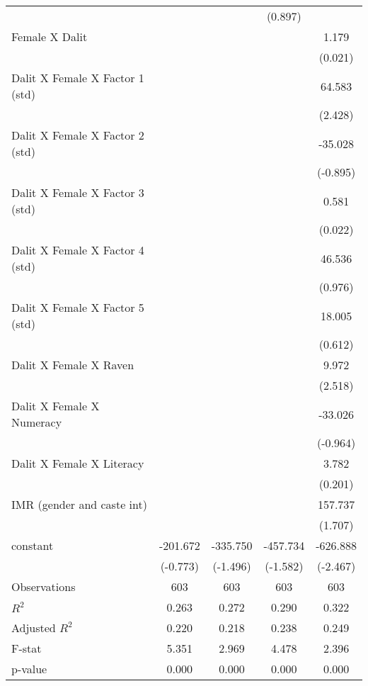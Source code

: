 \begin{table}[htbp]
{\begin{tabular}{lcccc}
          &       &       & (0.897) &  \\
    Female X Dalit &       &       &       & 1.179 \\
          &       &       &       & (0.021) \\
    Dalit X Female X Factor 1 (std) &       &       &       & 64.583 \\
          &       &       &       & (2.428) \\
    Dalit X Female X Factor 2 (std) &       &       &       & -35.028 \\
          &       &       &       & (-0.895) \\
    Dalit X Female X Factor 3 (std) &       &       &       & 0.581 \\
          &       &       &       & (0.022) \\
    Dalit X Female X Factor 4 (std) &       &       &       & 46.536 \\
          &       &       &       & (0.976) \\
    Dalit X Female X Factor 5 (std) &       &       &       & 18.005 \\
          &       &       &       & (0.612) \\
    Dalit X Female X Raven &       &       &       & 9.972 \\
          &       &       &       & (2.518) \\
    Dalit X Female X Numeracy &       &       &       & -33.026 \\
          &       &       &       & (-0.964) \\
    Dalit X Female X Literacy &       &       &       & 3.782 \\
          &       &       &       & (0.201) \\
    IMR (gender and caste int) &       &       &       & 157.737 \\
          &       &       &       & (1.707) \\
    constant & -201.672 & -335.750 & -457.734 & -626.888 \\
          & (-0.773) & (-1.496) & (-1.582) & (-2.467) \\
    \midrule
    Observations & 603   & 603   & 603   & 603 \\
    $R^2$ & 0.263 & 0.272 & 0.290 & 0.322 \\
    Adjusted $R^2$ & 0.220 & 0.218 & 0.238 & 0.249 \\
    F-stat & 5.351 & 2.969 & 4.478 & 2.396 \\
    p-value & 0.000 & 0.000 & 0.000 & 0.000 \\
    \bottomrule
    \end{tabular}%
    }
  \label{tab:addlabel}%
\end{table}%

